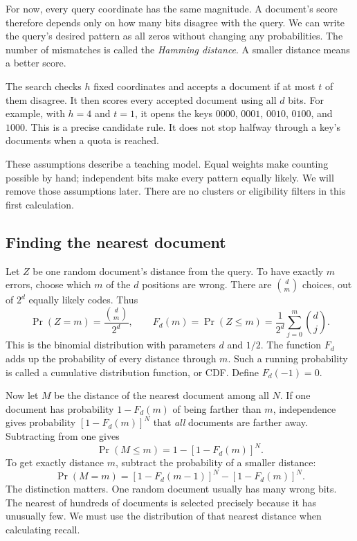 For now, every query coordinate has the same magnitude. A document's score therefore depends
only on how many bits disagree with the query. We can write the query's desired pattern as all
zeros without changing any probabilities. The number of mismatches is called the
\emph{Hamming distance}. A smaller distance means a better score.

The search checks $h$ fixed coordinates and accepts a document if at most $t$ of them disagree.
It then scores every accepted document using all $d$ bits. For example, with $h=4$ and $t=1$,
it opens the keys $0000$, $0001$, $0010$, $0100$, and $1000$. This is a precise candidate rule.
It does not stop halfway through a key's documents when a quota is reached.

These assumptions describe a teaching model. Equal weights make counting possible by hand;
independent bits make every pattern equally likely. We will remove those assumptions later.
There are no clusters or eligibility filters in this first calculation.

\subsection{Finding the nearest document}
Let $Z$ be one random document's distance from the query. To have exactly $m$ errors, choose
which $m$ of the $d$ positions are wrong. There are $\binom{d}{m}$ choices, out of $2^d$
equally likely codes. Thus
\begin{equation}
\Pr(Z=m)=\frac{\binom{d}{m}}{2^d},\qquad
F_d(m)=\Pr(Z\le m)=\frac{1}{2^d}\sum_{j=0}^{m}\binom{d}{j}.
\label{eq:one-document-distance}
\end{equation}
This is the binomial distribution with parameters $d$ and $1/2$. The function $F_d$ adds up the
probability of every distance through $m$. Such a running probability is called a cumulative
distribution function, or CDF. Define $F_d(-1)=0$.

Now let $M$ be the distance of the nearest document among all $N$. If one document has
probability $1-F_d(m)$ of being farther than $m$, independence gives probability
$[1-F_d(m)]^N$ that \emph{all} documents are farther away. Subtracting from one gives
\begin{equation}
\Pr(M\le m)=1-[1-F_d(m)]^N.
\label{eq:nearest-distance-cdf}
\end{equation}
To get exactly distance $m$, subtract the probability of a smaller distance:
\begin{equation}
\Pr(M=m)=[1-F_d(m-1)]^N-[1-F_d(m)]^N.
\label{eq:nearest-distance-mass}
\end{equation}
The distinction matters. One random document usually has many wrong bits. The nearest of
hundreds of documents is selected precisely because it has unusually few. We must use the distribution of that nearest distance when calculating recall.

